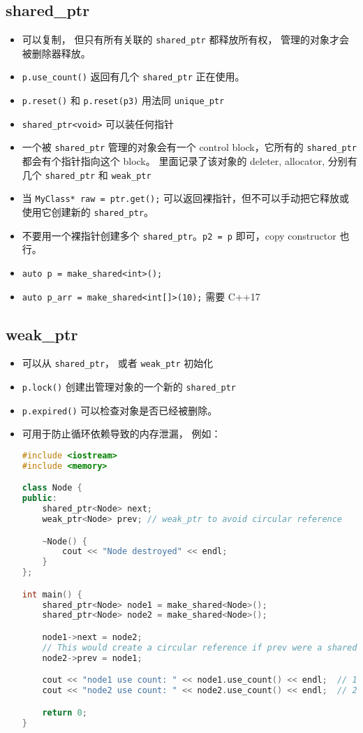 \subsection{shared\_ptr}
\begin{itemize}
\item 可以复制， 但只有所有关联的 \verb`shared_ptr` 都释放所有权， 管理的对象才会被删除器释放。
\item \verb`p.use_count()` 返回有几个 \verb`shared_ptr` 正在使用。
\item \verb`p.reset()` 和 \verb`p.reset(p3)` 用法同 \verb`unique_ptr`
\item \verb`shared_ptr<void>` 可以装任何指针
\item 一个被 \verb`shared_ptr` 管理的对象会有一个 control block，它所有的 \verb`shared_ptr` 都会有个指针指向这个 block。 里面记录了该对象的 deleter, allocator, 分别有几个 \verb`shared_ptr` 和 \verb`weak_ptr`
\item 当 \verb`MyClass* raw = ptr.get();` 可以返回裸指针，但不可以手动把它释放或使用它创建新的 \verb`shared_ptr`。
\item 不要用一个裸指针创建多个 \verb`shared_ptr`。\verb`p2 = p` 即可，copy constructor 也行。
\item \verb`auto p = make_shared<int>();`
\item \verb`auto p_arr = make_shared<int[]>(10);` 需要 C++17
\end{itemize}

\subsection{weak\_ptr}
\begin{itemize}
\item 可以从 \verb`shared_ptr`， 或者 \verb`weak_ptr` 初始化
\item \verb`p.lock()` 创建出管理对象的一个新的 \verb`shared_ptr`
\item \verb`p.expired()` 可以检查对象是否已经被删除。
\item 可用于防止循环依赖导致的内存泄漏， 例如：
\begin{lstlisting}[language=cpp]
#include <iostream>
#include <memory>

class Node {
public:
    shared_ptr<Node> next;
    weak_ptr<Node> prev; // weak_ptr to avoid circular reference

    ~Node() {
        cout << "Node destroyed" << endl;
    }
};

int main() {
    shared_ptr<Node> node1 = make_shared<Node>();
    shared_ptr<Node> node2 = make_shared<Node>();

    node1->next = node2;
    // This would create a circular reference if prev were a shared_ptr
    node2->prev = node1;

    cout << "node1 use count: " << node1.use_count() << endl;  // 1
    cout << "node2 use count: " << node2.use_count() << endl;  // 2

    return 0;
}
\end{lstlisting}
\end{itemize}
